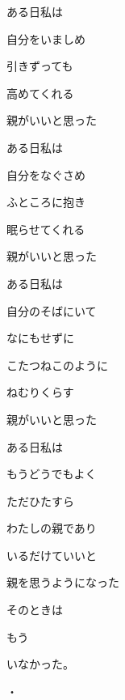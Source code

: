 

\author{Tomislav Mamić}


	
	ある日私は
	
	自分をいましめ
	
	引きずっても
	
	高めてくれる
	
	親がいいと思った
	
	\vspace{10pt}
	ある日私は
	
	自分をなぐさめ
	
	ふところに抱き
	
	眠らせてくれる
	
	親がいいと思った
	
	\vspace{10pt}
	ある日私は
	
	自分のそばにいて
	
	なにもせずに
	
	こたつねこのように
	
	ねむりくらす
	
	親がいいと思った
	
	\vspace{10pt}
	ある日私は
	
	もうどうでもよく
	
	ただひたすら
	
	わたしの親であり
	
	いるだけていいと
	
	親を思うようになった
	
	\vspace{10pt}
	そのときは
	
	もう
	
	いなかった。
	
	\vspace{20pt}
	・
